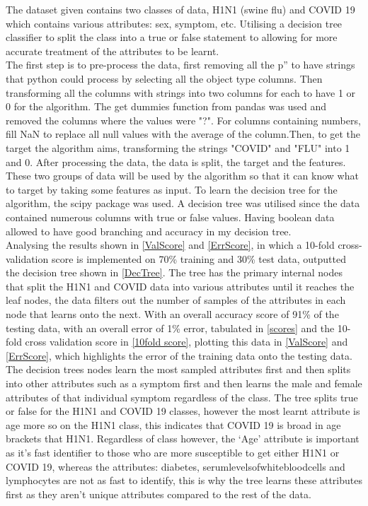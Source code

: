 
The dataset given contains two classes of data, H1N1 (swine flu) and COVID 19 which contains various attributes: sex, symptom, etc. Utilising a decision tree classifier to split the class into a true or false statement to allowing for more accurate treatment of the attributes to be learnt.  \\

The first step is to pre-process the data, first removing all the p'' to have strings that python could process by selecting all the object type columns. Then transforming all the columns with strings into two columns for each to have 1 or 0 for the algorithm. The get dummies function from pandas was used and removed the columns where the values were "?".  For columns containing numbers, fill NaN to replace all null values with the average of the column.Then, to get the target the algorithm aims, transforming the strings "COVID" and "FLU" into 1 and 0. After processing the data, the data is split, the target and the features. These two groups of data will be used by the algorithm so that it can know what to target by taking some features as input. To learn the decision tree for the algorithm, the scipy package was used. A decision tree was utilised since the data contained numerous columns with true or false values. Having boolean data allowed to have good branching and accuracy in my decision tree. \\

Analysing the results shown in \cref{ValScore} and \cref{ErrScore}, in which a 10-fold cross-validation score is implemented on 70\% training and 30\% test data, outputted the decision tree shown in \cref{DecTree}. The tree has the primary internal nodes that split the H1N1 and COVID data into various attributes until it reaches the leaf nodes, the data filters out the number of samples of the attributes in each node that learns onto the next. With an overall accuracy score of 91\% of the testing data, with an overall error of 1\% error, tabulated in \cref{scores} and the 10-fold cross validation score in \cref{10fold score}, plotting this data in \cref*{ValScore} and \cref*{ErrScore}, which highlights the error of the training data onto the testing data. \\

The decision trees nodes learn the most sampled attributes first and then splits into other attributes such as a symptom first and then learns the male and female attributes of that individual symptom regardless of the class. The tree splits true or false for the H1N1 and COVID 19 classes, however the most learnt attribute is age more so on the H1N1 class, this indicates that COVID 19 is broad in age brackets that H1N1. Regardless of class however, the ‘Age’ attribute is important as it’s fast identifier to those who are more susceptible to get either H1N1 or COVID 19, whereas the attributes: diabetes, serumlevelsofwhitebloodcells and lymphocytes are not as fast to identify, this is why the tree learns these attributes first as they aren’t unique attributes compared to the rest of the data.